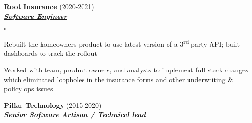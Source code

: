 \documentclass{article}
\newcommand{\employer}[3]{{ \textbf{#1} (#2)\\ \underline{\textbf{\emph{#3}}}\\  }}
\newenvironment{achievements}{\begin{list}{$\circ$}{\topsep 0pt \itemsep -2pt}}{\vspace*{4pt}\end{list}}
\newcommand{\ts}{\textsuperscript}
\begin{document}
\employer{Root Insurance}{2020-2021}{Software Engineer}
	\begin{achievements}
	\item Rebuilt the homeowners product to use latest version of a 3\ts{rd} party API; built dashboards to track the rollout
	\item Worked with team, product owners, and analysts to implement full stack changes which eliminated loopholes in the insurance forms and other underwriting \& policy ops issues
	\end{achievements}
\employer{Pillar Technology}{2015-2020}{Senior Software Artisan / Technical lead}
\end{document}
